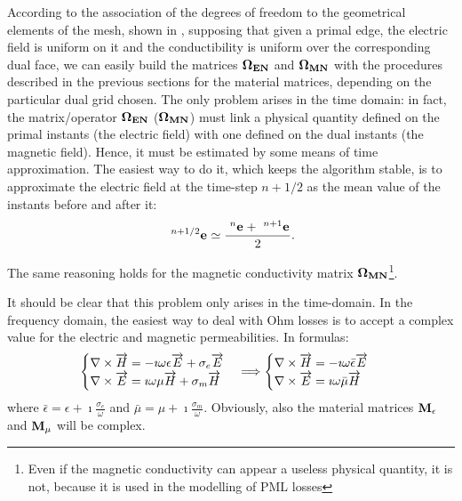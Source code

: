 According to the association of the degrees of freedom to the
geometrical elements of the mesh, shown in
, supposing that given a primal edge,
the electric field is uniform on it and the conductibility is uniform
over the corresponding dual face, we can easily build the matrices
$\Matrix{\Omega_{EN}}$ and $\Matrix{\Omega_{MN}}$ with the procedures
described in the previous sections for the material matrices,
depending on the particular dual grid chosen. The only problem arises
in the time domain: in fact, the matrix/operator $\Matrix{\Omega_{EN}}$
($\Matrix{\Omega_{MN}}$) must link a physical quantity defined on the
primal instants (the electric field) with one defined on the dual
instants (the magnetic field). Hence, it must be estimated by some
means of time approximation. The easiest way to do it, which keeps the
algorithm stable, is to approximate the electric field at the
time-step $n+1/2$ as the mean value of the instants before and after
it:
\begin{equation*}
  \Disc{\Array{e}}{}{n+1/2} \simeq \frac{\Disc{\Array{e}}{}{n} +
  \Disc{\Array{e}}{}{n+1}}{2} .
\end{equation*}

The same reasoning holds for the magnetic conductivity matrix
$\Matrix{\Omega_{MN}}$\footnote{Even if the magnetic conductivity can
  appear a useless physical quantity, it is not, because it is used in
  the modelling of PML losses}.

It should be clear that this problem only arises in the
time-domain. In the frequency domain, the easiest way to deal with Ohm
losses is to accept a complex value for the electric and magnetic
permeabilities. In formulas:
\begin{equation*}
    \begin{cases}
      \Rot{\H} = -\imath \omega \epsilon \E + \sigma_e \E \\
      \Rot{\E} = \imath \omega \mu \H + \sigma_m \H \\
    \end{cases}
    \Longrightarrow
    \begin{cases}
      \Rot{\H} = -\imath \omega \bar{\epsilon} \E \\
      \Rot{\E} = \imath \omega \bar{\mu} \H \\
    \end{cases}
\end{equation*}
where $\bar{\epsilon} = \epsilon + \imath \frac{\sigma_e}{\omega}$ and
$\bar{\mu} = \mu + \imath \frac{\sigma_m}{\omega}$. Obviously, also
the material matrices $\Matrix{M}_\epsilon$ and $\Matrix{M}_\mu$ will
be complex.

